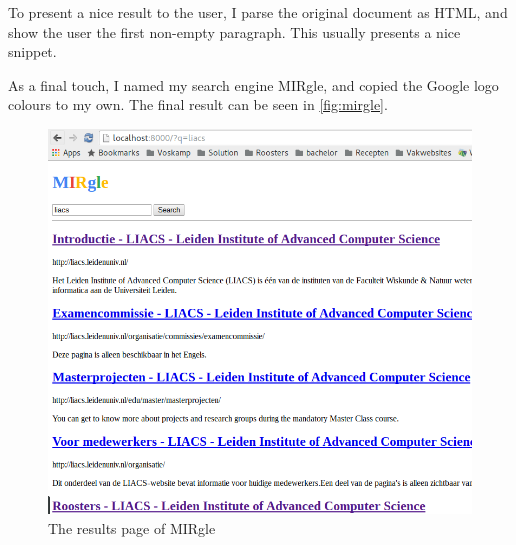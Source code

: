 \documentclass[12pt,a4paper]{article}
\begin{document}
To present a nice result to the user, I parse the original document as HTML, and show the user the first non-empty paragraph. This usually presents a nice snippet.

As a final touch, I named my search engine MIRgle, and copied the Google logo colours to my own. The final result can be seen in \autoref{fig:mirgle}.

\begin{figure}
\includegraphics[width=\textwidth]{screenshot}
\caption{The results page of MIRgle}
\label{fig:mirgle}
\end{figure}
\end{document}
